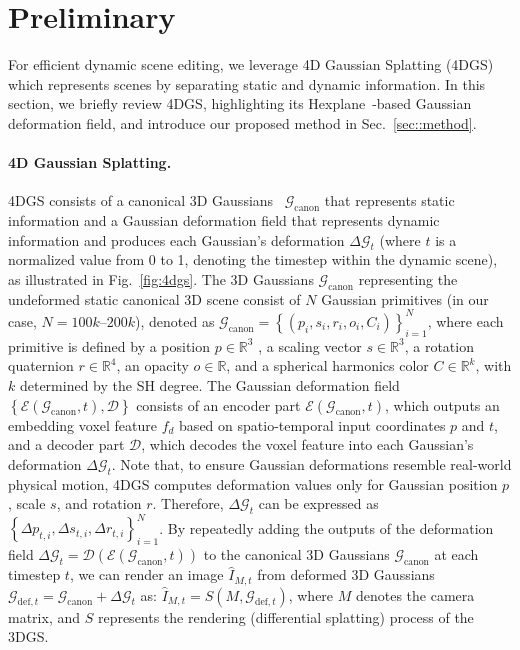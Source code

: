 \vspace{-4mm}
\section{Preliminary}
\vspace{-1mm}
For efficient dynamic scene editing, we leverage 4D Gaussian Splatting (4DGS)~\cite{ref_10_4dgs} which represents scenes by separating static and dynamic information. In this section, we briefly review 4DGS, highlighting its Hexplane~\cite{ref_16_hexplane, ref_15_kplanes}-based Gaussian deformation field, and introduce our proposed method in Sec.~\ref{sec::method}.


\vspace{-4mm}
\paragraph{4D Gaussian Splatting.}
4DGS consists of a canonical 3D Gaussians~\cite{ref_8_gs} $\mathcal{G}_{\text{canon}}$ that represents static information and a Gaussian deformation field that represents dynamic information and produces each Gaussian’s deformation $\Delta  \mathcal{G}_t$ (where $t$ is a normalized value from 0 to 1, denoting the timestep within the dynamic scene), as illustrated in Fig.~\ref{fig:4dgs}. The 3D Gaussians $\mathcal{G}_{\text{canon}}$ representing the undeformed static canonical 3D scene consist of $N$ Gaussian primitives (in our case, $N=100k$–$200k$), denoted as $\mathcal{G}_{\text{canon}} = \left\{(p_i, s_i, r_i, o_i, C_i)\right\}_{i=1}^N$, where each primitive is defined by a position $p \in \mathbb{R}^3$ , a scaling vector $s\in \mathbb{R}^3$, a rotation quaternion $r\in \mathbb{R}^4$, an opacity $o\in \mathbb{R}$, and a spherical harmonics color $C\in \mathbb{R}^k$, with $k$ determined by the SH degree. The Gaussian deformation field $\left\{\mathcal{E}(\mathcal{G}_{\text{canon}}, t), \mathcal{D}\right\}$ consists of an encoder part $\mathcal{E}(\mathcal{G}_{\text{canon}}, t)$, which outputs an embedding voxel feature $f_d$ based on spatio-temporal input coordinates $p$ and $t$, and a decoder part $\mathcal{D}$, which decodes the voxel feature into each Gaussian’s deformation $\Delta \mathcal{G}_t$. Note that, to ensure Gaussian deformations resemble real-world physical motion, 4DGS computes deformation values only for Gaussian position $p$, scale $s$, and rotation $r$. Therefore, $\Delta \mathcal{G}_t$ can be expressed as $\left\{ \Delta p_{t,i}, \Delta s_{t,i}, \Delta r_{t,i} \right\}_{i=1}^N$. By repeatedly adding the outputs of the deformation field $\Delta \mathcal{G}_t = \mathcal{D}(\mathcal{E}(\mathcal{G}_{\text{canon}},t))$ to the canonical 3D Gaussians $\mathcal{G}_{\text{canon}}$ at each timestep $t$, we can render an image $\hat{I}_{M, t}$ from deformed 3D Gaussians $\mathcal{G}_{\text{def},t} = \mathcal{G}_{\text{canon}} + \Delta \mathcal{G}_t$ as: $\hat{I}_{M, t} = S(M, \mathcal{G}_{\text{def},t})$, where $M$ denotes the camera matrix, and $S$ represents the rendering (differential splatting) process of the 3DGS. 


